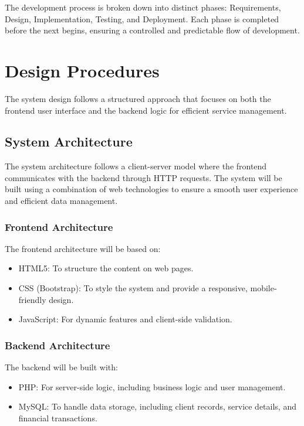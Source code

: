 \documentclass[a4paper,12pt]{report}
\begin{document}
The development process is broken down into distinct phases: Requirements, Design, Implementation, Testing, and Deployment. Each phase is completed before the next begins, ensuring a controlled and predictable flow of development.

\section{Design Procedures}
The system design follows a structured approach that focuses on both the frontend user interface and the backend logic for efficient service management.

\subsection{System Architecture}
The system architecture follows a client-server model where the frontend communicates with the backend through HTTP requests. The system will be built using a combination of web technologies to ensure a smooth user experience and efficient data management.

\subsubsection{Frontend Architecture}
The frontend architecture will be based on:
\begin{itemize}
    \item HTML5: To structure the content on web pages.
    \item CSS (Bootstrap): To style the system and provide a responsive, mobile-friendly design.
    \item JavaScript: For dynamic features and client-side validation.
\end{itemize}

\subsubsection{Backend Architecture}
The backend will be built with:
\begin{itemize}
    \item PHP: For server-side logic, including business logic and user management.
    \item MySQL: To handle data storage, including client records, service details, and financial transactions.
\end{itemize}

\end{document}
